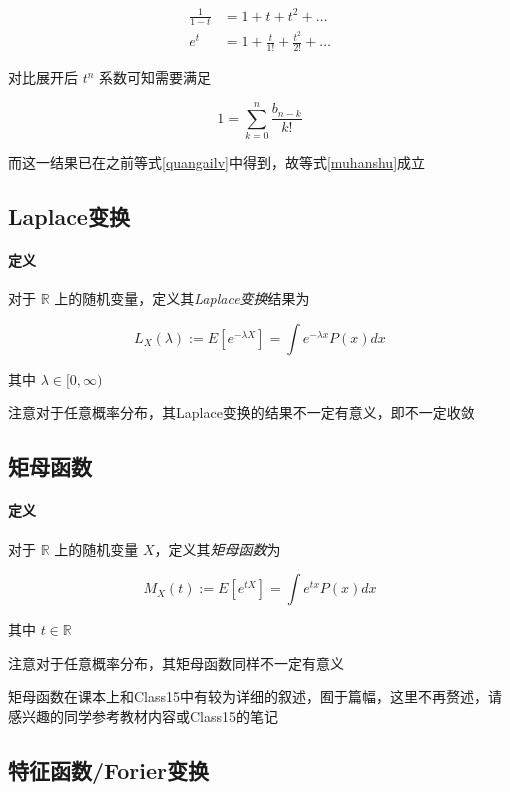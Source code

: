\documentclass[a4paper, 11pt]{article} %
\begin{document}
\begin{align*}
\frac{1}{1-t}&=1+t+t^2+\dots \\
e^t&=1+\frac{t}{1!}+\frac{t^2}{2!}+\dots
\end{align*}

对比展开后 $t^n$ 系数可知需要满足 

\begin{equation*}
1=\sum\limits_{k=0}^n\frac{b_{n-k}}{k!}
\end{equation*}

而这一结果已在之前等式\ref{quangailv}中得到，故等式\ref{muhanshu}成立

\subsection{Laplace变换}

\paragraph{定义}

对于 $\mathbb{R}$ 上的随机变量，定义其\emph{Laplace变换}结果为

\begin{equation*}
	L_X(\lambda):=E[e^{-\lambda X}]=\int e^{-\lambda x}P(x)dx
\end{equation*}

其中 $\lambda\in[0,\infty)$

注意对于任意概率分布，其Laplace变换的结果不一定有意义，即不一定收敛

\subsection{矩母函数}

\paragraph{定义} 

对于 $\mathbb{R}$ 上的随机变量 $X$，定义其\emph{矩母函数}为

$$
M_X(t):=E[e^{tX}]=\int e^{tx}P(x)dx
$$

其中 $t\in\mathbb{R}$

注意对于任意概率分布，其矩母函数同样不一定有意义

矩母函数在课本上和Class15中有较为详细的叙述，囿于篇幅，这里不再赘述，请感兴趣的同学参考教材内容或Class15的笔记

\subsection{特征函数/Forier变换}
\end{document}
